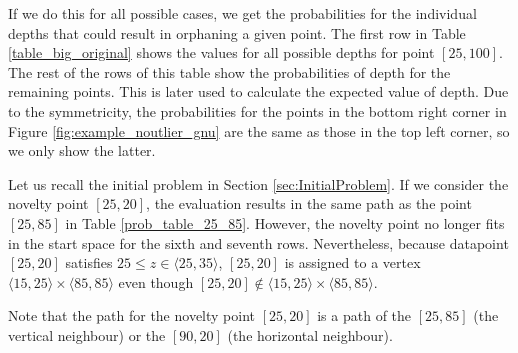 If we do this for all possible cases, we get the probabilities for the individual depths that could result in orphaning a given point. The first row in Table \ref{table_big_original} shows the values for all possible depths for point $[25,100]$. 
The rest of the rows of this table show the probabilities of depth for the remaining points.
This is later used to calculate the expected value of depth.
Due to the symmetricity, the probabilities for the points in the bottom right corner in Figure \ref{fig:example_noutlier_gnu} are the same as those in the top left corner, so we only show the latter.

Let us recall the initial problem in Section \ref{sec:InitialProblem}.
If we consider the novelty point $[25,20]$, the evaluation results in the same path as the point $[25,85]$ in Table \ref{prob_table_25_85}. However, the novelty point no longer fits in the start space for the sixth and seventh rows. Nevertheless, because datapoint $[25,20]$ satisfies  $25 \le z \in \langle 25, 35 \rangle$,  $[25,20]$ is assigned to a vertex $\langle 15, 25 \rangle \times \langle 85, 85 \rangle$ even though $[25,20] \notin \langle 15, 25 \rangle \times \langle 85, 85 \rangle$.

Note that the path for the novelty point $[25,20]$ is a path of the $[25,85]$ (the vertical neighbour) or the $[90,20]$ (the horizontal neighbour).



